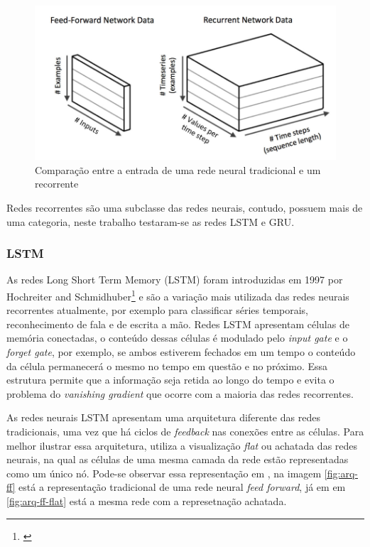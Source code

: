 \begin{figure}[H] 
  \includegraphics[width= 12cm]{../figuras/redes/input-rnn.png}
  \caption{Comparação entre a entrada de uma rede neural tradicional
  e um recorrente \cite{dl-oreilly}}
  \label{fig:input-rnn}
\end{figure}

Redes recorrentes são uma subclasse das redes neurais, contudo, possuem mais
de uma categoria, neste trabalho testaram-se as redes LSTM e GRU.

\subsubsection{LSTM}

As redes Long Short Term Memory (LSTM) foram introduzidas em 1997 por Hochreiter 
and Schmidhuber\footnote{\cite{lstm-origem}} e são a variação mais utilizada das redes
neurais recorrentes atualmente, por exemplo para classificar séries temporais, 
reconhecimento de fala e de escrita a mão. Redes LSTM apresentam células de 
memória conectadas, o conteúdo dessas células é modulado pelo \textit{input gate} e o \textit{forget gate},
por exemplo, se ambos estiverem fechados em um tempo o conteúdo da célula permanecerá 
o mesmo no tempo em questão e no próximo. Essa estrutura permite que a informação
seja retida ao longo do tempo e evita o problema do \textit{vanishing gradient} que 
ocorre com a maioria das redes recorrentes.

As redes neurais LSTM apresentam uma arquitetura diferente 
das redes tradicionais, uma vez que há ciclos de \textit{feedback}
nas conexões entre as células. Para melhor ilustrar essa 
arquitetura, \cite{dl-oreilly} utiliza a visualização \textit{flat} 
ou achatada das redes neurais, na qual as células de uma mesma 
camada da rede estão representadas como um único nó.
Pode-se observar essa representação em \label{fig:comparacao-ff-flat-normal},
na imagem \ref{fig:arq-ff} está a representação tradicional 
de uma rede neural \textit{feed forward}, já em em 
\ref{fig:arq-ff-flat} está a mesma rede com a represetnação 
achatada.

